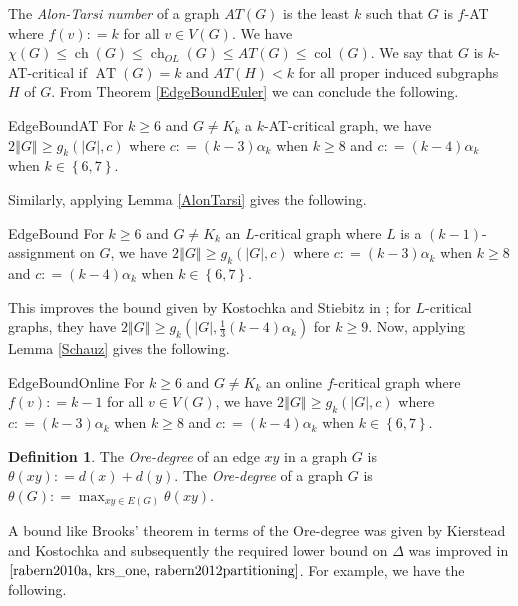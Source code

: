 \documentclass[12pt]{article}
\theoremstyle{plain}
\theoremstyle{definition}
\newtheorem{defn}{Definition}
\theoremstyle{remark}
\newcommand{\set}[1]{\left\{ #1 \right\}}
\newcommand{\card}[1]{\left|#1\right|}
\newcommand{\size}[1]{\left\Vert#1\right\Vert}
\newcommand{\DefinedAs}{\mathrel{\mathop:}=}
\newcommand{\AT}{\operatorname{AT}}
\newcommand{\col}{\operatorname{col}}
\newcommand{\ch}{\operatorname{ch}}
\begin{document}
The \emph{Alon-Tarsi number} of a graph $AT(G)$ is the least $k$ such that $G$ is $f$-AT where $f(v) \DefinedAs k$ for all $v \in V(G)$. We have $\chi(G) \leq \ch(G) \leq \ch_{OL}(G) \leq AT(G) \leq \col(G)$.  We say that $G$ is $k$-AT-critical if $\AT(G) = k$ and $AT(H) < k$ for all proper induced subgraphs $H$ of $G$.  From Theorem \ref{EdgeBoundEuler} we can conclude the following.

\begin{repthm}{EdgeBoundAT}
For $k \geq 6$ and $G \neq K_k$ a $k$-AT-critical graph, we have $2\size{G} \geq g_k(\card{G}, c)$ where $c \DefinedAs (k-3)\alpha_k$ when $k \geq 8$ and $c \DefinedAs (k-4)\alpha_k$ when $k \in \set{6,7}$.
\end{repthm}

\noindent Similarly, applying Lemma \ref{AlonTarsi} gives the following.

\begin{repthm}{EdgeBound}
For $k \geq 6$ and $G \neq K_k$ an $L$-critical graph where $L$ is a $(k-1)$-assignment on $G$, we have  $2\size{G} \geq g_k(\card{G}, c)$ where $c \DefinedAs (k-3)\alpha_k$ when $k \geq 8$ and $c \DefinedAs (k-4)\alpha_k$ when $k \in \set{6,7}$.
\end{repthm}

This improves the bound given by Kostochka and Stiebitz in \cite{kostochkastiebitzedgesincriticalgraph}; for $L$-critical graphs, they have $2\size{G} \geq g_k(\card{G}, \frac13 (k-4)\alpha_k)$ for $k \geq 9$.  Now, applying Lemma \ref{Schauz} gives the following.

\begin{repthm}{EdgeBoundOnline}
For $k \geq 6$ and $G \neq K_k$ an online $f$-critical graph where $f(v) \DefinedAs k-1$ for all $v \in V(G)$, we have  $2\size{G} \geq g_k(\card{G}, c)$ where $c \DefinedAs (k-3)\alpha_k$ when $k \geq 8$ and $c \DefinedAs (k-4)\alpha_k$ when $k \in \set{6,7}$.
\end{repthm}

\begin{defn}
The \emph{Ore-degree} of an edge $xy$ in a graph $G$ is $\theta(xy) \DefinedAs d(x) + d(y)$.  The \emph{Ore-degree} of a graph $G$ is $\theta(G) \DefinedAs \max_{xy \in E(G)}\theta(xy)$.
\end{defn}

A bound like Brooks' theorem in terms of the Ore-degree was given by Kierstead and Kostochka \cite{kierstead2009ore} and subsequently the required lower bound on $\Delta$ was improved in $\cite{rabern2010a, krs_one, rabern2012partitioning}$.  For example, we have the following.
\end{document}
